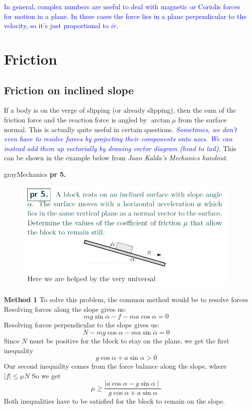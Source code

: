 \textcolor{blue}{In general, complex numbers are useful to deal with magnetic or Coriolis forces for motion in a plane. In these cases the force lies in a plane perpendicular to the velocity, so it's just proportional to $i\dot{r}$.}

\section{Friction}
\subsection{Friction on inclined slope}
If a body is on the verge of slipping (or already slipping), then the sum of the friction force and the reaction force is angled by $\arctan{\mu}$ from the surface normal. This is actually quite useful in certain questions. \textcolor{blue}{\textit{Sometimes, we don't even have to resolve forces by projecting their components onto axes. We can instead add them up vectorially by drawing vector diagram (head to tail).}} This can be shown in the example below from \textit{Jaan Kalda's Mechanics handout}.

\begin{mybox}{gray}{Mechanics \textbf{pr 5.}}
    \begin{figure}
        \includegraphics[scale=0.5]{pr 5.jpg}
    \end{figure}

    \textbf{Method 1} \quad
    To solve this problem, the common method would be to resolve forces
    Resolving forces along the slope gives us:
    $$mg\sin\alpha-f-ma\cos\alpha=0$$
    Resolving forces perpendicular to the slope gives us:
    $$N-mg\cos\alpha-ma\sin\alpha=0$$
    Since $N$ must be positive for the block to stay on the plane, we get the first inequality
    $$g\cos\alpha+a\sin\alpha > 0$$
    Our second inequality comes from the force balance along the slope, where $\mid f \mid\leq\mu N$
    So we get
    \begin{equation}
        \mu \geq \frac{\mid a\cos\alpha-g\sin\alpha \mid}{g\cos\alpha+a\sin\alpha}
    \end{equation}
    Both inequalities have to be satisfied for the block to remain on the slope.
\end{mybox}



